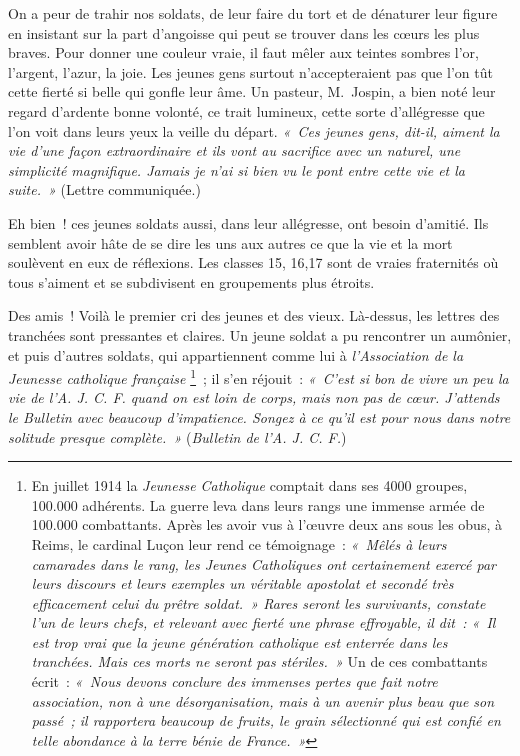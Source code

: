 \documentclass[french,twoside]{book} %
\begin{document}
On a peur de trahir nos soldats, de leur faire du tort et de dénaturer leur figure en insistant sur la part d’angoisse qui peut se trouver dans les cœurs les plus braves. Pour donner une couleur vraie, il faut mêler aux teintes sombres l’or, l’argent, l’azur, la joie. Les jeunes gens surtout n’accepteraient pas que l’on tût cette fierté si belle qui gonfle leur âme. Un pasteur, M. Jospin, a bien noté leur regard d’ardente bonne volonté, ce trait lumineux, cette sorte d’allégresse que l’on voit dans leurs yeux la veille du départ. \emph{« Ces jeunes gens, dit-il, aiment la vie d’une façon extraordinaire et ils vont au sacrifice avec un naturel, une simplicité magnifique. Jamais je n’ai si bien vu le pont entre cette vie et la suite. »} (Lettre communiquée.)‌\par
Eh bien ! ces jeunes soldats aussi, dans leur allégresse, ont besoin d’amitié. Ils semblent avoir hâte de se dire les uns aux autres ce que la vie et la mort soulèvent en eux de réflexions. Les classes 15, 16,17 sont de vraies fraternités où tous s’aiment et se subdivisent en groupements plus étroits.‌\par
Des amis ! Voilà le premier cri des jeunes et des vieux. Là-dessus, les lettres des tranchées sont pressantes et claires. Un jeune soldat a pu rencontrer un aumônier, et puis d’autres soldats, qui appartiennent comme lui à {\itshape l’Association de la Jeunesse catholique française} \footnote{ \noindent En juillet 1914 la {\itshape Jeunesse Catholique} comptait dans ses 4000 groupes, 100.000 adhérents. La guerre leva dans leurs rangs une immense armée de 100.000 combattants. Après les avoir vus à l’œuvre deux ans sous les obus, à Reims, le cardinal Luçon leur rend ce témoignage : \emph{« Mêlés à leurs camarades dans le rang, les {\itshape Jeunes Catholiques} ont certainement exercé par leurs discours et leurs exemples un véritable apostolat et secondé très efficacement celui du prêtre soldat. » Rares seront les survivants, constate l’un de leurs chefs, et relevant avec fierté une phrase effroyable, il dit : « Il est trop vrai que la jeune génération catholique est enterrée dans les tranchées. Mais ces morts ne seront pas stériles. »} Un de ces combattants écrit : \emph{« Nous devons conclure des immenses pertes que fait notre association, non à une désorganisation, mais à un avenir plus beau que son passé ; il rapportera beaucoup de fruits, le grain sélectionné qui est confié en telle abondance à la terre bénie de France. »}
 } ; il s’en réjouit : \emph{« C’est si bon de vivre un peu la vie de l’A. J. C. F. quand on est loin de corps, mais non pas de cœur. J’attends le {\itshape Bulletin} avec beaucoup d’impatience. Songez à ce qu’il est pour nous dans notre solitude presque complète. »} ({\itshape Bulletin de l’A. J. C. F.})‌\par
\end{document}
